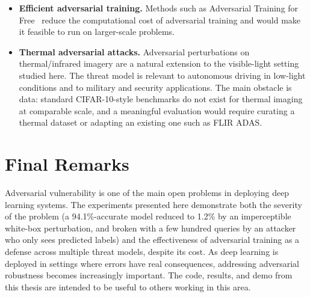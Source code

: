 \begin{itemize}
    \item \textbf{Efficient adversarial training.} Methods such as Adversarial Training for Free~\cite{shafahi2019adversarialfree} reduce the computational cost of adversarial training and would make it feasible to run on larger-scale problems.

    \item \textbf{Thermal adversarial attacks.} Adversarial perturbations on thermal/infrared imagery are a natural extension to the visible-light setting studied here. The threat model is relevant to autonomous driving in low-light conditions and to military and security applications. The main obstacle is data: standard CIFAR-10-style benchmarks do not exist for thermal imaging at comparable scale, and a meaningful evaluation would require curating a thermal dataset or adapting an existing one such as FLIR ADAS.
\end{itemize}

\section{Final Remarks}

Adversarial vulnerability is one of the main open problems in deploying deep learning systems. The experiments presented here demonstrate both the severity of the problem (a 94.1\%-accurate model reduced to 1.2\% by an imperceptible white-box perturbation, and broken with a few hundred queries by an attacker who only sees predicted labels) and the effectiveness of adversarial training as a defense across multiple threat models, despite its cost. As deep learning is deployed in settings where errors have real consequences, addressing adversarial robustness becomes increasingly important. The code, results, and demo from this thesis are intended to be useful to others working in this area.

